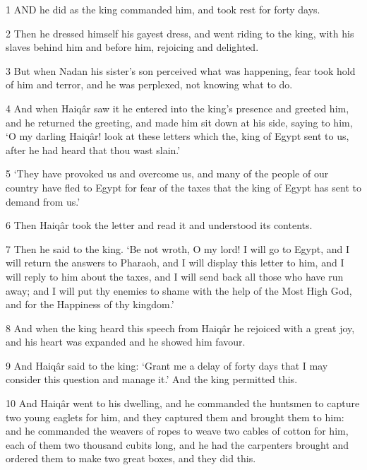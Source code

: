 \par 1 AND he did as the king commanded him, and took rest for forty days.

\par 2 Then he dressed himself his gayest dress, and went riding to the king, with his slaves behind him and before him, rejoicing and delighted.

\par 3 But when Nadan his sister's son perceived what was happening, fear took hold of him and terror, and he was perplexed, not knowing what to do.

\par 4 And when Haiqâr saw it he entered into the king's presence and greeted him, and he returned the greeting, and made him sit down at his side, saying to him, ‘O my darling Haiqâr! look at these letters which the, king of Egypt sent to us, after he had heard that thou wast slain.’

\par 5 ‘They have provoked us and overcome us, and many of the people of our country have fled to Egypt for fear of the taxes that the king of Egypt has sent to demand from us.’

\par 6 Then Haiqâr took the letter and read it and understood its contents.

\par 7 Then he said to the king. ‘Be not wroth, O my lord! I will go to Egypt, and I will return the answers to Pharaoh, and I will display this letter to him, and I will reply to him about the taxes, and I will send back all those who have run away; and I will put thy enemies to shame with the help of the Most High God, and for the Happiness of thy kingdom.’

\par 8 And when the king heard this speech from Haiqâr he rejoiced with a great joy, and his heart was expanded and he showed him favour.

\par 9 And Haiqâr said to the king: ‘Grant me a delay of forty days that I may consider this question and manage it.’ And the king permitted this.

\par 10 And Haiqâr went to his dwelling, and he commanded the huntsmen to capture two young eaglets for him, and they captured them and brought them to him: and he commanded the weavers of ropes to weave two cables of cotton for him, each of them two thousand cubits long, and he had the carpenters brought and ordered them to make two great boxes, and they did this.

